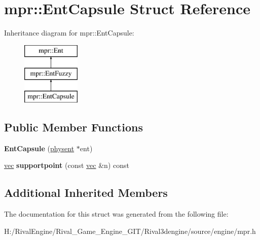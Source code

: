 \hypertarget{structmpr_1_1_ent_capsule}{}\section{mpr\+:\+:Ent\+Capsule Struct Reference}
\label{structmpr_1_1_ent_capsule}
Inheritance diagram for mpr\+:\+:Ent\+Capsule\+:\begin{figure}[H]
\begin{center}
\leavevmode
\includegraphics[height=3.000000cm]{structmpr_1_1_ent_capsule}
\end{center}
\end{figure}
\subsection*{Public Member Functions}
\begin{DoxyCompactItemize}
\item 
\mbox{\label{structmpr_1_1_ent_capsule_add2b3d9bd9bd815883c26a477bf63943}} 
{\bfseries Ent\+Capsule} (\hyperlink{structphysent}{physent} $\ast$ent)
\item 
\mbox{\label{structmpr_1_1_ent_capsule_a506d3e637201e76b7433e8447e897dc8}} 
\hyperlink{structvec}{vec} {\bfseries supportpoint} (const \hyperlink{structvec}{vec} \&n) const
\end{DoxyCompactItemize}
\subsection*{Additional Inherited Members}


The documentation for this struct was generated from the following file\+:\begin{DoxyCompactItemize}
\item 
H\+:/\+Rival\+Engine/\+Rival\+\_\+\+Game\+\_\+\+Engine\+\_\+\+G\+I\+T/\+Rival3dengine/source/engine/mpr.\+h\end{DoxyCompactItemize}

